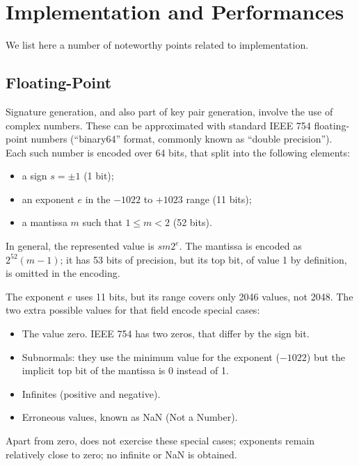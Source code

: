 \chapter{Implementation and Performances}\label{chap:impl}

We list here a number of noteworthy points related to implementation.

\section{Floating-Point}

Signature generation, and also part of key pair generation, involve the
use of complex numbers. These can be approximated with standard IEEE 754
floating-point numbers (``binary64'' format, commonly known as ``double
precision''). Each such number is encoded over 64 bits, that split into
the following elements:
\begin{itemize}
  \item a sign $s = \pm 1$ (1 bit);
  \item an exponent $e$ in the $-1022$ to $+1023$ range (11 bits);
  \item a mantissa $m$ such that $1\le m< 2$ (52 bits).
\end{itemize}
In general, the represented value is $sm2^e$. The mantissa is encoded as
$2^{52}(m-1)$; it has 53 bits of precision, but its top bit, of value 1
by definition, is omitted in the encoding.

The exponent $e$ uses 11 bits, but its range covers only 2046 values, not
2048. The two extra possible values for that field encode special cases:
\begin{itemize}
  \item The value zero. IEEE 754 has two zeros, that differ by the sign
  bit.
  \item Subnormals: they use the minimum value for the exponent ($-1022$)
  but the implicit top bit of the mantissa is 0 instead of 1.
  \item Infinites (positive and negative).
  \item Erroneous values, known as NaN (Not a Number).
\end{itemize}

Apart from zero, \falcon does not exercise these special cases; exponents
remain relatively close to zero; no infinite or NaN is obtained.


